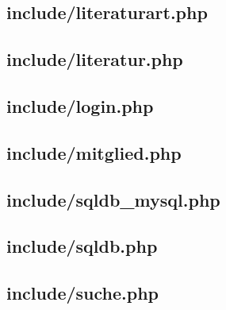 \subsection{include/literaturart.php}


\subsection{include/literatur.php}


\subsection{include/login.php}


\subsection{include/mitglied.php}


\subsection{include/sqldb\_mysql.php}


\subsection{include/sqldb.php}


\subsection{include/suche.php}



